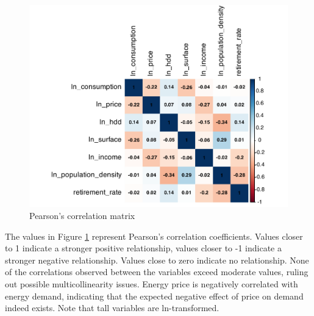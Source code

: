 \documentclass[12pt,twoside]{reedthesis}
\begin{document}
\newpage
\begin{figure}

{\centering \includegraphics[width=0.9\linewidth]{figure/correlation_matrix} 

}

\caption{Pearson’s correlation matrix}\label{fig:correlation-plot}
\end{figure}
\noindent
The values in Figure \ref{fig:correlation-plot} represent Pearson's correlation coefficients. Values closer to 1 indicate a stronger positive relationship, values closer to -1 indicate a stronger negative relationship. Values close to zero indicate no relationship. None of the correlations observed between the variables exceed moderate values, ruling out possible multicollinearity issues. Energy price is negatively correlated with energy demand, indicating that the expected negative effect of price on demand indeed exists. Note that tall variables are ln-transformed.
\end{document}
